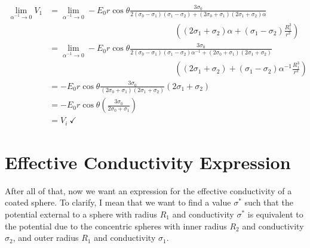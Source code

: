 \begin{displaymath}
    \begin{split}
        \lim_{\alpha^{-1} \to 0} V_1
        & =
        \lim_{\alpha^{-1} \to 0}
            -E_0r\cos\theta\frac{3\sigma_0}{2 (\sigma_0-\sigma_1)(\sigma_1 - \sigma_2) + (2\sigma_0 + \sigma_1)(2\sigma_1 + \sigma_2)\alpha}
    \\ &\quad\quad\quad\quad\quad\quad\quad\quad\quad\quad\quad\quad\quad\quad\quad\left(
            (2\sigma_1 + \sigma_2)\alpha +
             (\sigma_1 - \sigma_2) \frac{R_1^3}{r^3}
    \right)
    \\
        & =
        \lim_{\alpha^{-1} \to 0}
            -E_0r\cos\theta\frac{3\sigma_0}{2 (\sigma_0-\sigma_1)(\sigma_1 - \sigma_2)\alpha^{-1} + (2\sigma_0 + \sigma_1)(2\sigma_1 + \sigma_2)}
    \\&\quad\quad\quad\quad\quad\quad\quad\quad\quad\quad\quad\quad\quad\quad\quad\left(
            (2\sigma_1 + \sigma_2) +
             (\sigma_1 - \sigma_2)\alpha^{-1} \frac{R_1^3}{r^3}
    \right)
    \\
        & =
            -E_0r\cos\theta\frac{3\sigma_0}{(2\sigma_0 + \sigma_1)(2\sigma_1 + \sigma_2)}
    \left(
            2\sigma_1 + \sigma_2
    \right)
        \\
        & =
            -E_0r\cos\theta\left(\frac{3\sigma_0}{2\sigma_0 + \sigma_1}\right)
            \\
            & = V_i ~\checkmark
    \end{split}
\end{displaymath}


\section{Effective Conductivity Expression}
After all of that, now we want an expression for the effective conductivity of a coated sphere. To clarify, I mean that we want to find a value $\sigma^*$ such that the potential external to a sphere with radius $R_1$ and conductivity $\sigma^*$ is equivalent to the potential due to the concentric spheres with inner radius $R_2$ and conductivity $\sigma_2$, and outer radius $R_1$ and conductivity $\sigma_1$.

